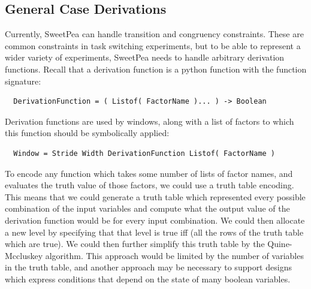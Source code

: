 \subsection{General Case Derivations}

Currently, SweetPea can handle transition and congruency constraints. These are common constraints in task switching experiments, but to be able to represent a wider variety of experiments, SweetPea needs to handle arbitrary derivation functions. Recall that a derivation function is a python function with the function signature:

\begin{verbatim}
  DerivationFunction = ( Listof( FactorName )... ) -> Boolean
\end{verbatim}

Derivation functions are used by windows, along with a list of factors to which this function should be symbolically applied:

\begin{verbatim}
  Window = Stride Width DerivationFunction Listof( FactorName )
\end{verbatim}

To encode any function which takes some number of lists of factor names, and evaluates the truth value of those factors, we could use a truth table encoding. This means that we could generate a truth table which represented every possible combination of the input variables and compute what the output value of the derivation function would be for every input combination. We could then allocate a new level by specifying that that level is true iff (all the rows of the truth table which are true). We could then further simplify this truth table by the Quine-Mccluskey algorithm. This approach would be limited by the number of variables in the truth table, and another approach may be necessary to support designs which express conditions that depend on the state of many boolean variables.

%
%
%


